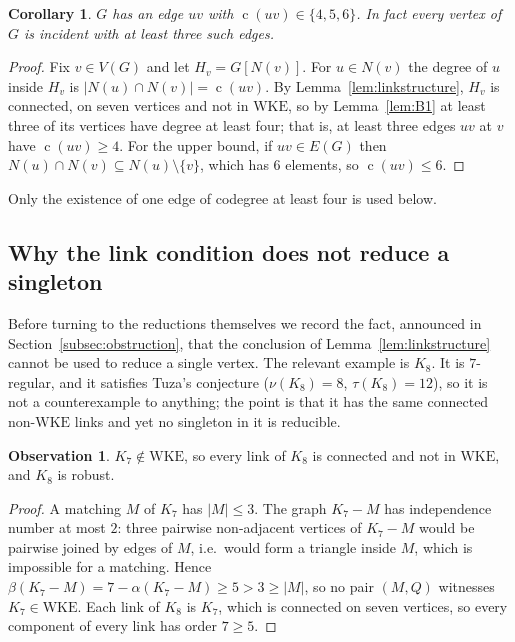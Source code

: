 \documentclass[11pt,a4paper]{amsart}
\theoremstyle{plain}
\newtheorem{corollary}[theorem]{Corollary}
\theoremstyle{definition}
\newtheorem{observation}[theorem]{Observation}
\newcommand{\WKE}{\mathrm{WKE}}
\newcommand{\cod}{\operatorname{c}}
\newcommand{\N}{N}
\newcommand{\vc}{\beta}
\begin{document}
\begin{corollary}\label{cor:trichotomy}
$G$ has an edge $uv$ with $\cod(uv)\in\{4,5,6\}$. In fact every vertex of $G$
is incident with at least three such edges.
\end{corollary}

\begin{proof}
Fix $v\in V(G)$ and let $H_v=G[\N(v)]$. For $u\in \N(v)$ the degree of $u$
inside $H_v$ is $|\N(u)\cap \N(v)|=\cod(uv)$. By
Lemma~\ref{lem:linkstructure}, $H_v$ is connected, on seven vertices and not
in $\WKE$, so by Lemma~\ref{lem:B1} at least three of its vertices have degree
at least four; that is, at least three edges $uv$ at $v$ have $\cod(uv)\ge4$.
For the upper bound, if $uv\in E(G)$ then
$\N(u)\cap \N(v)\subseteq \N(u)\setminus\{v\}$, which has $6$ elements, so
$\cod(uv)\le 6$.
\end{proof}

Only the existence of one edge of codegree at least four is used below.

\subsection{Why the link condition does not reduce a singleton}
\label{subsec:k8}

Before turning to the reductions themselves we record the fact, announced in
Section~\ref{subsec:obstruction}, that the conclusion of
Lemma~\ref{lem:linkstructure} cannot be used to reduce a single vertex. The
relevant example is $K_8$. It is $7$-regular, and it satisfies Tuza's
conjecture ($\nu(K_8)=8$, $\tau(K_8)=12$), so it is not a counterexample to
anything; the point is that it has the same connected non-$\WKE$ links and
yet no singleton in it is reducible.

\begin{observation}\label{obs:k7nonwke}
$K_7\notin\WKE$, so every link of $K_8$ is connected and not in $\WKE$, and
$K_8$ is robust.
\end{observation}

\begin{proof}
A matching $M$ of $K_7$ has $|M|\le3$. The graph $K_7-M$ has independence
number at most $2$: three pairwise non-adjacent vertices of $K_7-M$ would be
pairwise joined by edges of $M$, i.e.\ would form a triangle inside $M$, which
is impossible for a matching. Hence
$\vc(K_7-M)=7-\alpha(K_7-M)\ge 5>3\ge|M|$, so no pair $(M,Q)$ witnesses
$K_7\in\WKE$. Each link of $K_8$ is $K_7$, which is connected on seven
vertices, so every component of every link has order $7\ge5$.
\end{proof}
\end{document}
